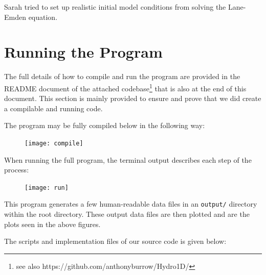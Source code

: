 \documentclass[12pt]{article}
\begin{document}
Sarah tried to set up realistic initial model conditions from solving the Lane-Emden equation.


\section{Running the Program}

The full details of how to compile and run the program are provided in the README document of the attached
codebase\footnote{see also https://github.com/anthonyburrow/Hydro1D/} that is also at the end of this
document. This section is mainly provided to ensure and prove that we did create a compilable and running code.

The program may be fully compiled below in the following way:
\begin{figure}[H]
    \centering
    \texttt{[image: compile]}
    \label{fig:compile}
\end{figure}
When running the full program, the terminal output describes each step of the process:
\begin{figure}[H]
    \centering
    \texttt{[image: run]}
    \label{fig:run}
\end{figure}

This program generates a few human-readable data files in an \texttt{output/} directory within the
root directory. These output data files are then plotted and are the plots seen in the above figures.



\pagebreak

The scripts and implementation files of our source code is given below:
\end{document}

